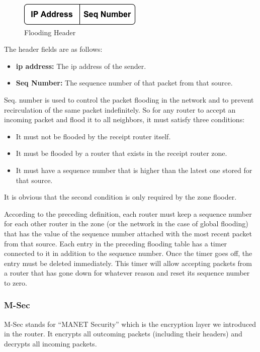 \begin{figure}[!htb]
    \centering
    \includegraphics[scale=1]{images/flood_header.png}
    \caption{Flooding Header}
    \label{fig:flood-header}
\end{figure}

The header fields are as follows:
\begin{itemize}[itemsep=1pt, topsep=5pt]
    \item \textbf{\acrshort{ip} address:} The \acrshort{ip} address of the sender.
    \item \textbf{Seq Number:} The sequence number of that packet from that source.
\end{itemize}

Seq. number is used to control the packet flooding in the network and to prevent recirculation of the same packet indefinitely. So for any router to accept an incoming packet and flood it to all neighbors, it must satisfy three conditions:

\begin{itemize}[itemsep=1pt, topsep=5pt]
    \item It must not be flooded by the receipt router itself. 
    \item It must be flooded by a router that exists in the receipt router zone.
    \item It must have a sequence number that is higher than the latest one stored for that source.
\end{itemize}

It is obvious that the second condition is only required by the zone flooder.

According to the preceding definition, each router must keep a sequence number for each other router in the zone (or the network in the case of global flooding) that has the value of the sequence number attached with the most recent packet from that source. Each entry in the preceding flooding table has a timer connected to it in addition to the sequence number. Once the timer goes off, the entry must be deleted immediately. This timer will allow accepting packets from a router that has gone down for whatever reason and reset its sequence number to zero.

\subsubsection{M-Sec}
M-Sec stands for ``MANET Security'' which is the encryption layer we introduced in the router.
It encrypts all outcoming packets (including their headers) and decrypts all incoming packets.

